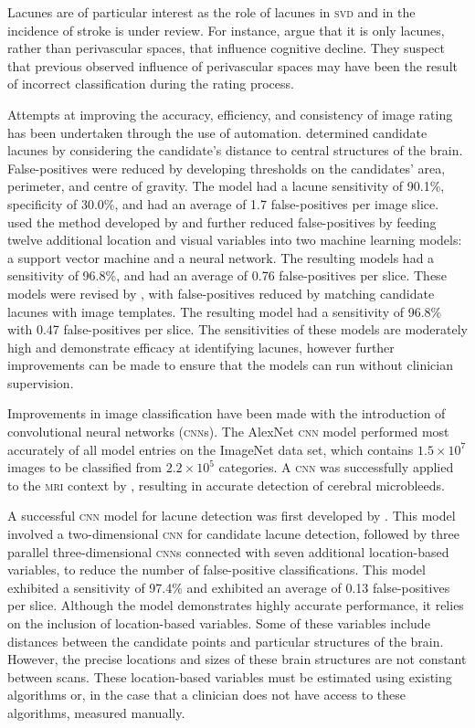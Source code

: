 Lacunes are of particular interest as the role of lacunes in \textsc{svd} and in the incidence of stroke is under review. For instance, \cite{BenjaminJ.Philip2018LIbN} argue that it is only lacunes, rather than perivascular spaces, that influence cognitive decline. They suspect that previous observed influence of perivascular spaces may have been the result of incorrect classification during the rating process.

Attempts at improving the accuracy, efficiency, and consistency of image rating has been undertaken through the use of automation. \cite{Yokoyama2007} determined candidate lacunes by considering the candidate's distance to central structures of the brain. False-positives were reduced by developing thresholds on the candidates' area, perimeter, and centre of gravity. The model had a lacune sensitivity of 90.1\%, specificity of 30.0\%, and had an average of 1.7 false-positives per image slice. \cite{Uchiyama20071554, Uchiyama2007b} used the method developed by \cite{Yokoyama2007} and further reduced false-positives by feeding twelve additional location and visual variables into two machine learning models: a support vector machine and a neural network. The resulting models had a sensitivity of 96.8\%, and had an average of 0.76 false-positives per slice. These models were revised by \citep{Uchiyama2015}, with false-positives reduced by matching candidate lacunes with image templates. The resulting model had a sensitivity of 96.8\% with 0.47 false-positives per slice. The sensitivities of these models are moderately high and demonstrate efficacy at identifying lacunes, however further improvements can be made to ensure that the models can run without clinician supervision.

Improvements in image classification have been made with the introduction of convolutional neural networks (\textsc{cnn}s). The AlexNet \textsc{cnn} model \citep{AlexNet2012} performed most accurately of all model entries on the ImageNet data set, which contains $1.5\times10^{7}$ images to be classified from $2.2\times10^5$ categories. A \textsc{cnn} was successfully applied to the \textsc{mri} context by \cite{DouQ.2016ADoC}, resulting in accurate detection of cerebral microbleeds.

A successful \textsc{cnn} model for lacune detection was first developed by \cite{GhafoorianM.2017Dml3}. This model involved a two-dimensional \textsc{cnn} for candidate lacune detection, followed by three parallel three-dimensional \textsc{cnn}s connected with seven additional location-based variables, to reduce the number of false-positive classifications. This model exhibited a sensitivity of 97.4\% and exhibited an average of 0.13 false-positives per slice. Although the model demonstrates highly accurate performance, it relies on the inclusion of location-based variables. Some of these variables include distances between the candidate points and particular structures of the brain. However, the precise locations and sizes of these brain structures are not constant between scans. These location-based variables must be estimated using existing algorithms or, in the case that a clinician does not have access to these algorithms, measured manually. 

